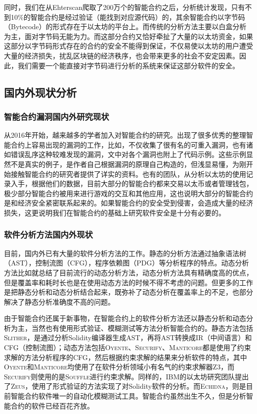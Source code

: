 同时，我们在从Ehterscan爬取了200万个的智能合约之后，分析统计发现，只有不到10\%的智能合约是经过验证（能找到对应源代码）的，其余智能合约以字节码（Bytecode）的形式存在于以太坊的平台上。而传统的分析方法主要以白盒分析为主，面对字节码无能为力。而这部分合约又恰好牵扯了大量的以太坊资金，如果这部分以字节码形式存在的合约的安全不能得到保证，不仅易使以太坊的用户遭受大量的经济损失，扰乱区块链的经济秩序，也会带来更多的社会不安定因素。因此，我们需要一个能直接对字节码进行分析的系统来保证这部分软件的安全。

\subsection{国内外现状分析}

\subsubsection{智能合约漏洞国内外研究现状}

从2016年开始，越来越多的学者加入对智能合约的研究。出现了很多优秀的整理智能合约上容易出现的漏洞的工作，比如\cite{survey-on-attacks}，不仅收集了很有名的可重入漏洞，也有诸如错误乱序这种较难发现的漏洞，文中对各个漏洞也附上了代码示例。这些示例显然不是真实的例子，是作者自己根据漏洞的原理自己构造的，但浅显易懂，为刚开始接触智能合约的研究者提供了详实的资料。也有的团队\cite{survey-on-smart-contracts}，从分析以太坊的使用记录入手，根据他们的数据，目前大部分的智能合约都来交易以太币或者管理钱包，极少部分智能合约被用来进行游戏的交互和其他应用，这也说明大部分的智能合约是和经济安全紧密联系起来的。如果智能合约的安全受到侵害，会造成大量的经济损失，这更说明我们在智能合约的基础上研究软件安全是十分有必要的。

\subsubsection{软件分析方法国内外现状}

目前，国内外已有大量的软件分析方法的工作。静态的分析方法通过抽象语法树（AST），控制流图（CFG），程序依赖图（PDG）等分析程序的特点。动态分析方法比如\cite{survey-dynamic}就总结了目前流行的动态分析方法，动态分析方法具有精确度高的优点，但是覆盖率和耗时长也是在使用动态方法的时候不得不考虑的问题。但更多的工作是把静态分析和动态分析结合起来，既弥补了动态分析在覆盖率上的不足，也部分解决了静态分析准确度不高的问题。

由于智能合约还属于新事物，在智能合约上的软件分析方法还以静态分析和动态分析为主，当然也有使用形式验证、模糊测试等方法分析智能合约的。静态方法包括\textsc{Slither}\cite{slither}，是通过分析Solidity编译器生成AST，再将AST转换成IR（中间语言）和CFG（控制流图）；动态方法包括\textsc{Oyente}\cite{oyente}、\textsc{Securify}\cite{securify}、\textsc{Manticore}\cite{manticore}都是使用了约束求解的方法分析程序的CFG，然后根据约束求解的结果来分析软件的特点，其中\textsc{Oyente}和\textsc{Manticore}均使用了在软件分析领域小有名气的约束求解器Z3\cite{z3}，而\textsc{Securify}则使用的是\textsc{Souffle}\cite{souffle}进行约束求解。同样的，IBM的以太坊研究团队提出了\textsc{Zeus}\cite{zeus}，使用了形式验证的方法实现了对Solidity软件的分析。而\textsc{Echidna}\cite{echidna}，则是目前智能合约软件唯一的自动化模糊测试工具。智能合约虽然出生不久，但是分析智能合约的软件已经百花齐放。

